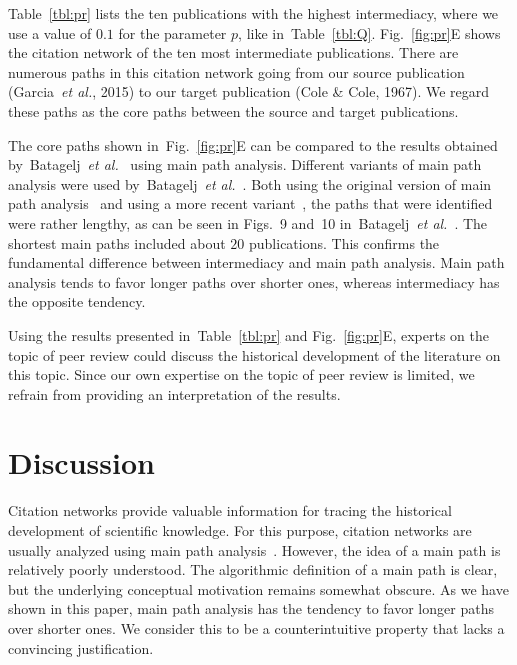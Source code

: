 \documentclass[9pt,twocolumn,twoside]{pnas-alt} %
\theoremstyle{definition}
\newcommand{\subfigref}[2]{Fig.~\ref{fig:#1}#2\xspace}
\newcommand{\tblref}[1]{Table~\ref{tbl:#1}\xspace}
\renewcommand{\etal}{~\emph{et al.}\xspace}
\begin{document}
\tblref{pr} lists the ten publications with the highest intermediacy, where we use a value of $0.1$ for the parameter $p$, like in~\tblref{Q}. \subfigref{pr}{E} shows the citation network of the ten most intermediate publications. There are numerous paths in this citation network going from our source publication (Garcia\etal, 2015) to our target publication (Cole \& Cole, 1967). We regard these paths as the core paths between the source and target publications.

The core paths shown in~\subfigref{pr}{E} can be compared to the results obtained by~Batagelj\etal~\cite{Batagelj2017} using main path analysis. Different variants of main path analysis were used by~Batagelj\etal~\cite{Batagelj2017}. Both using the original version of main path analysis~\cite{Hummon1989} and using a more recent variant~\cite{Liu2012}, the paths that were identified were rather lengthy, as can be seen in Figs.~9 and~10 in~Batagelj\etal~\cite{Batagelj2017}. The shortest main paths included about $20$ publications. This confirms the fundamental difference between intermediacy and main path analysis. Main path analysis tends to favor longer paths over shorter ones, whereas intermediacy has the opposite tendency.

Using the results presented in~\tblref{pr} and \subfigref{pr}{E}, experts on the topic of peer review could discuss the historical development of the literature on this topic. Since our own expertise on the topic of peer review is limited, we refrain from providing an interpretation of the results.

%
%

\section*{\label{sec:discussion}Discussion}

Citation networks provide valuable information for tracing the historical development of scientific knowledge. For this purpose, citation networks are usually analyzed using main path analysis~\cite{Hummon1989}. However, the idea of a main path is relatively poorly understood. The algorithmic definition of a main path is clear, but the underlying conceptual motivation remains somewhat obscure. As we have shown in this paper, main path analysis has the tendency to favor longer paths over shorter ones. We consider this to be a counterintuitive property that lacks a convincing justification.
\end{document}
